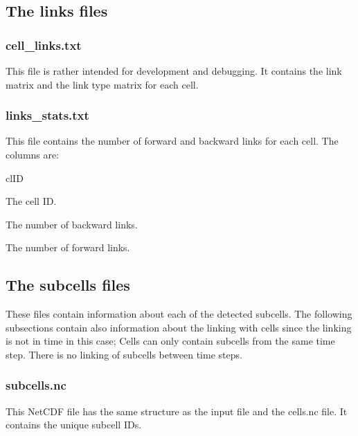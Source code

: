 \documentclass{scrartcl}
\begin{document}
\subsection{The links files}
\subsubsection{cell\_links.txt}
This file is rather intended for development and debugging. It contains the link matrix and the link type matrix for each cell.

\subsubsection{links\_stats.txt}
This file contains the number of forward and backward links for each cell. The columns are:
\begin{labeling}{clID}
	\item[clID] The cell ID.
	\item[nbw] The number of backward links.
	\item[nfw] The number of forward links.

\end{labeling}

\subsection{The subcells files}
These files contain information about each of the detected subcells. The following subsections contain also information about the linking with cells since the linking is not in time in this case; Cells can only contain subcells from the same time step. There is no linking of subcells between time steps.

\subsubsection{subcells.nc}
This NetCDF file has the same structure as the input file and the cells.nc file. It contains the unique subcell IDs.
\end{document}

